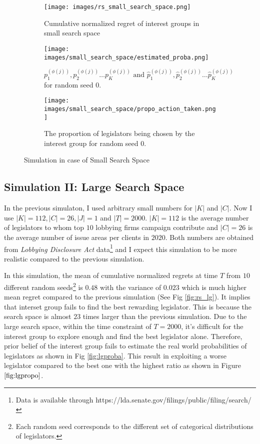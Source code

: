 \documentclass{article}
\begin{document}
\begin{figure}[h!]  
    \centering %
    \begin{subfigure}[b]{0.45\textwidth}
        \texttt{[image: images/rs\_small\_search\_space.png]}
        \caption{Cumulative normalized regret of interest groups in small search space}
        \label{fig:rs_small}
    \end{subfigure}
    \begin{subfigure}[b]{0.5\textwidth}
        \texttt{[image: images/small\_search\_space/estimated\_proba.png]}
        \caption{$p_1^{(\phi(j))}, p_2^{(\phi(j))} \hdots p_K^{(\phi(j))} \text{ and } \hat{p}_1^{(\phi(j))}, \hat{p}_2^{(\phi(j))} \hdots \hat{p}_K^{(\phi(j))}$ for random seed $0$.}
        \label{fig:smallproba}
    \end{subfigure}

    \begin{subfigure}[b]{1\columnwidth}
        \centering
        \texttt{[image: images/small\_search\_space/propo\_action\_taken.png]}
        \caption{The proportion of legislators being chosen by the interest group for random seed $0$.}
        \label{fig:smallpropo}
    \end{subfigure}
    \caption{Simulation in case of Small Search Space}
\end{figure}
    
\subsection{Simulation II: Large Search Space}
In the previous simulaton, 
I used 
arbitrary small numbers for $|K|$ and $|C|$.
Now I use $|K|=112, |C|=26, |J|=1$ and $|T|=2000$.
$|K|=112$ is the average number of 
legislators to whom top 
$10$ lobbying firms campaign contribute 
and $|C|=26$ is the average number of
issue areas per clients in $2020$.
Both numbers are obtained from \textit{Lobbying Disclosure Act} data\footnote{Data is available through https://lda.senate.gov/filings/public/filing/search/}
and I expect this simulation to be more realistic compared to the previous simulation.

In this simulation, the mean of cumulative normalized regrets at time $T$ from 
$10$ different random seeds\footnote{Each random seed  
corresponds to the different set of categorical distributions of legislators. 
} is $0.48$ with the variance of $0.023$ which is much higher mean regret compared to the previous simulation 
(See Fig \ref{fig:rs_lg}).
It implies that interset group fails to find the best rewarding legislator.
This is because 
the search space is almost $23$ times larger than the previous simulation.
Due to the large search space, 
within the time constraint of $T=2000$,
it's difficult for the interest group to 
explore enough and find the best legislator alone.
Therefore, prior belief of the interest group fails to estimate 
the real world probabilities of legislators as shown in Fig \ref{fig:lgproba}.
This result in exploiting 
a worse legislator compared to the best one with the highest ratio 
as shown in Figure $\ref{fig:lgpropo}$.
\end{document}
